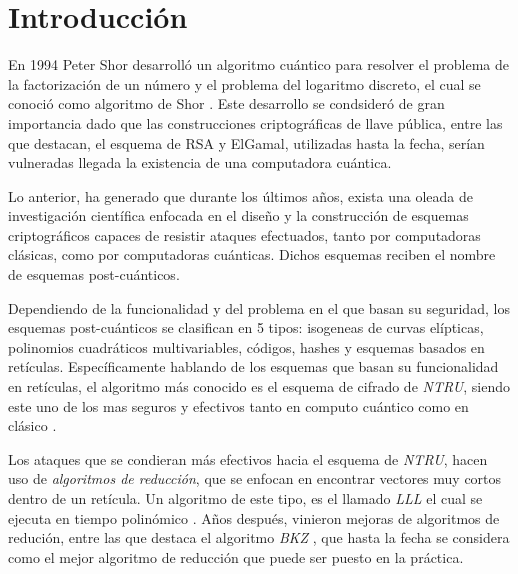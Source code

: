 \documentclass{llncs}
\begin{document}
\section{Introducci\'on}
En 1994 Peter Shor desarroll\'o un algoritmo cu\'antico para resolver el problema de la factorizaci\'on de un número y el problema del logaritmo discreto, el cual se conoci\'o como algoritmo de Shor \cite{b0}. Este desarrollo se condsider\'o de gran importancia dado que las construcciones criptogr\'aficas de llave p\'ublica, entre las que destacan, el esquema de RSA y ElGamal, utilizadas hasta la fecha, ser\'ian vulneradas llegada la existencia de una computadora cu\'antica.

Lo anterior, ha generado que durante los \'ultimos años, exista una oleada de investigaci\'on cient\'ifica enfocada en el diseño y la construcci\'on de esquemas criptogr\'aficos capaces de resistir ataques efectuados, tanto por computadoras cl\'asicas, como por computadoras cu\'anticas. Dichos esquemas reciben el nombre de esquemas post-cu\'anticos.

Dependiendo de la funcionalidad y del problema en el que basan su seguridad, los esquemas post-cu\'anticos se clasifican en 5 tipos: isogeneas de curvas el\'ipticas, 
polinomios cuadr\'aticos multivariables, c\'odigos, hashes y esquemas basados en ret\'iculas. Espec\'ificamente hablando de los esquemas que basan su funcionalidad en ret\'iculas, el algoritmo m\'as conocido es el esquema de cifrado de \textit{NTRU}, siendo este uno de los mas seguros y efectivos tanto en computo cu\'antico como en cl\'asico \cite{b1}.

Los ataques que se condieran m\'as efectivos hacia el esquema de \textit{NTRU}, hacen uso de \textit{algoritmos de reducción}, que se enfocan en encontrar vectores muy cortos dentro de un ret\'icula. Un algoritmo de este tipo, es el llamado \textit{LLL} el cual se ejecuta en tiempo polin\'omico \cite{b2}. Años despu\'es, vinieron mejoras de algoritmos de reduci\'on, entre las que destaca el algoritmo \textit{BKZ} \cite{b3}, que hasta la fecha se considera como el mejor algoritmo de reducci\'on que puede ser puesto en la pr\'actica.
\end{document}
